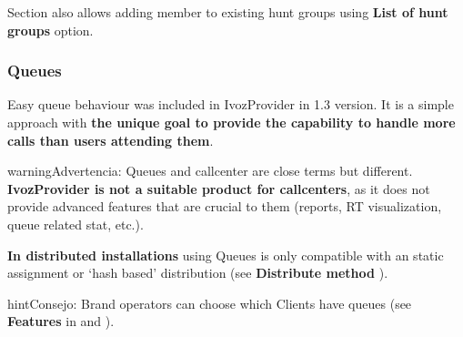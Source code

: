 \documentclass[letterpaper,10pt,spanish]{sphinxmanual}
\begin{document}
Section {\hyperref[administration_portal/client/vpbx/users:users]{}} also allows adding member to existing hunt groups using \textbf{List of hunt groups} option.


\subsubsection{Queues}
\label{administration_portal/client/vpbx/routing_endpoints/queues:queues}\label{administration_portal/client/vpbx/routing_endpoints/queues::doc}
Easy queue behaviour was included in IvozProvider in 1.3 version. It is a simple
approach with \textbf{the unique goal to provide the capability to handle more calls
than users attending them}.

\begin{notice}{warning}{Advertencia:}
Queues and callcenter are close terms but different. \textbf{IvozProvider
is not a suitable product for callcenters}, as it does not provide
advanced features that are crucial to them (reports, RT visualization,
queue related stat, etc.).
\end{notice}

\textbf{In distributed installations} using Queues is only compatible with an static
assignment or `hash based' distribution (see \textbf{Distribute method} {\hyperref[administration_portal/brand/clients/virtual_pbx:virtual\string-pbx]{}}).

\begin{notice}{hint}{Consejo:}
Brand operators can choose which Clients have queues (see \textbf{Features}
in {\hyperref[getting_started/internal_calls/brand_portal:brand\string-configuration]{}} and {\hyperref[getting_started/internal_calls/client_portal:client\string-configuration]{}}).
\end{notice}
\end{document}

